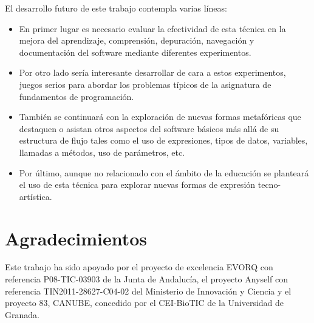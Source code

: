 \documentclass{llncs}
\begin{document}
El desarrollo futuro de este trabajo contempla varias líneas:
\begin{itemize}
\item En primer lugar es necesario evaluar la efectividad de esta técnica en la mejora del aprendizaje, comprensión, depuración, navegación y documentación del software mediante diferentes experimentos.
\item Por otro lado sería interesante desarrollar de cara a estos experimentos, juegos serios para abordar los problemas típicos de la asignatura de fundamentos de programación.
\item También se continuará con la exploración de nuevas formas metafóricas que destaquen o asistan otros aspectos del software básicos más allá de su estructura de flujo tales como el uso de expresiones, tipos de datos, variables, llamadas a métodos, uso de parámetros, etc. %
\item Por último, aunque no relacionado con el ámbito de la educación se planteará el uso de esta técnica para explorar nuevas formas de expresión tecno-artística.
\end{itemize}





\section*{Agradecimientos}
Este trabajo ha sido apoyado por el proyecto de excelencia EVORQ con
referencia P08-TIC-03903 de la Junta de Andalucía, el proyecto Anyself
con referencia TIN2011-28627-C04-02 del Ministerio de Innovación y
Ciencia y el proyecto 83, CANUBE, concedido por el CEI-BioTIC de la
Universidad de Granada. 





\end{document}
